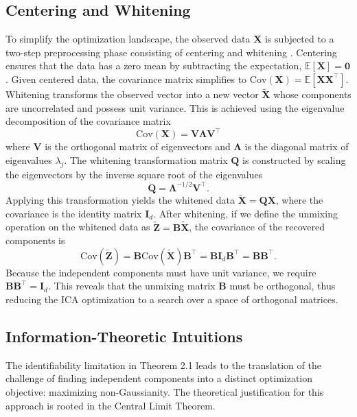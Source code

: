 \documentclass[12pt,a4paper,twoside,openany]{book}
\begin{document}
\subsection{Centering and Whitening}
To simplify the optimization landscape, the observed data $\mathbf{X}$ is subjected to a two-step preprocessing phase consisting of centering and whitening \cite[Chapter 6]{hyvarinen2001}. 
Centering ensures that the data has a zero mean by subtracting the expectation, $\mathbb{E}[\mathbf{X}] = \mathbf{0}$.
Given centered data, the covariance matrix simplifies to $\mathrm{Cov}(\mathbf{X}) = \mathbb{E}[\mathbf{X}\mathbf{X}^\top]$. 
Whitening transforms the observed vector into a new vector $\widetilde{\mathbf{X}}$ whose components are uncorrelated and possess unit variance. 
This is achieved using the eigenvalue decomposition of the covariance matrix
\begin{equation}
    \mathrm{Cov}(\mathbf{X}) = \mathbf{V}\mathbf{\Lambda}\mathbf{V}^\top
\end{equation}
where $\mathbf{V}$ is the orthogonal matrix of eigenvectors and $\mathbf{\Lambda}$ is the diagonal matrix of eigenvalues $\lambda_j$. 
The whitening transformation matrix $\mathbf{Q}$ is constructed by scaling the eigenvectors by the inverse square root of the eigenvalues
\begin{equation}
    \mathbf{Q} = \mathbf{\Lambda}^{-1/2} \mathbf{V}^\top.
\end{equation}
Applying this transformation yields the whitened data $\widetilde{\mathbf{X}} = \mathbf{Q}\mathbf{X}$, where the covariance is the identity matrix $\mathbf{I}_d$.
After whitening, if we define the unmixing operation on the whitened data as $\widetilde{\mathbf{Z}} = \mathbf{B} \widetilde{\mathbf{X}}$, the covariance of the recovered components is
\begin{equation}
    \mathrm{Cov}(\widetilde{\mathbf{Z}}) = \mathbf{B} \mathrm{Cov}(\widetilde{\mathbf{X}}) \mathbf{B}^\top = \mathbf{B} \mathbf{I}_d \mathbf{B}^\top = \mathbf{B}\mathbf{B}^\top.
\end{equation}
Because the independent components must have unit variance, we require $\mathbf{B}\mathbf{B}^\top = \mathbf{I}_d$. 
This reveals that the unmixing matrix $\mathbf{B}$ must be orthogonal, thus reducing the ICA optimization to a search over a space of orthogonal matrices.

\subsection{Information-Theoretic Intuitions}
The identifiability limitation in Theorem 2.1 leads to the translation of the challenge of finding independent components into 
a distinct optimization objective: maximizing non-Gaussianity. The theoretical justification for this approach is rooted in the Central Limit Theorem. 
\end{document}
